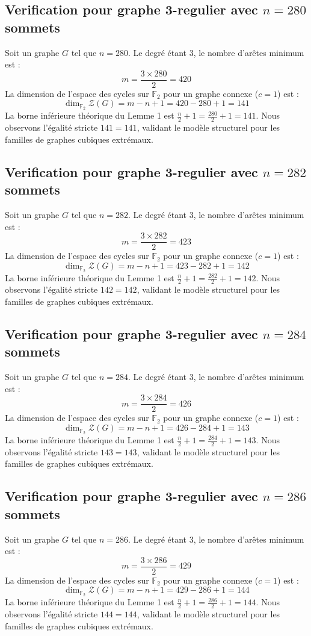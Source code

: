\documentclass[11pt,a4paper]{article}
\begin{document}
\subsection{Verification pour graphe 3-regulier avec $n=280$ sommets}
Soit un graphe $G$ tel que $n = 280$. Le degré étant 3, le nombre d'arêtes minimum est :
$$ m = \frac{3 \times 280}{2} = 420 $$
La dimension de l'espace des cycles sur $\mathbb{F}_2$ pour un graphe connexe ($c=1$) est :
$$ \dim_{\mathbb{F}_2} \mathcal{Z}(G) = m - n + 1 = 420 - 280 + 1 = 141 $$
La borne inférieure théorique du Lemme 1 est $\frac{n}{2} + 1 = \frac{280}{2} + 1 = 141$.
Nous observons l'égalité stricte $141 = 141$, validant le modèle structurel pour les familles de graphes cubiques extrémaux.

\subsection{Verification pour graphe 3-regulier avec $n=282$ sommets}
Soit un graphe $G$ tel que $n = 282$. Le degré étant 3, le nombre d'arêtes minimum est :
$$ m = \frac{3 \times 282}{2} = 423 $$
La dimension de l'espace des cycles sur $\mathbb{F}_2$ pour un graphe connexe ($c=1$) est :
$$ \dim_{\mathbb{F}_2} \mathcal{Z}(G) = m - n + 1 = 423 - 282 + 1 = 142 $$
La borne inférieure théorique du Lemme 1 est $\frac{n}{2} + 1 = \frac{282}{2} + 1 = 142$.
Nous observons l'égalité stricte $142 = 142$, validant le modèle structurel pour les familles de graphes cubiques extrémaux.

\subsection{Verification pour graphe 3-regulier avec $n=284$ sommets}
Soit un graphe $G$ tel que $n = 284$. Le degré étant 3, le nombre d'arêtes minimum est :
$$ m = \frac{3 \times 284}{2} = 426 $$
La dimension de l'espace des cycles sur $\mathbb{F}_2$ pour un graphe connexe ($c=1$) est :
$$ \dim_{\mathbb{F}_2} \mathcal{Z}(G) = m - n + 1 = 426 - 284 + 1 = 143 $$
La borne inférieure théorique du Lemme 1 est $\frac{n}{2} + 1 = \frac{284}{2} + 1 = 143$.
Nous observons l'égalité stricte $143 = 143$, validant le modèle structurel pour les familles de graphes cubiques extrémaux.

\subsection{Verification pour graphe 3-regulier avec $n=286$ sommets}
Soit un graphe $G$ tel que $n = 286$. Le degré étant 3, le nombre d'arêtes minimum est :
$$ m = \frac{3 \times 286}{2} = 429 $$
La dimension de l'espace des cycles sur $\mathbb{F}_2$ pour un graphe connexe ($c=1$) est :
$$ \dim_{\mathbb{F}_2} \mathcal{Z}(G) = m - n + 1 = 429 - 286 + 1 = 144 $$
La borne inférieure théorique du Lemme 1 est $\frac{n}{2} + 1 = \frac{286}{2} + 1 = 144$.
Nous observons l'égalité stricte $144 = 144$, validant le modèle structurel pour les familles de graphes cubiques extrémaux.
\end{document}
